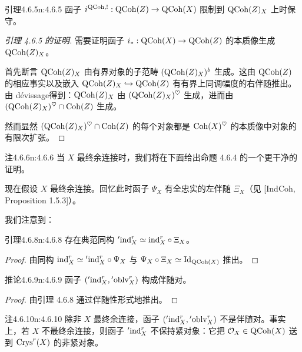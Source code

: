 \begin{othm}{引理}{4.6.5}{n:4.6.5}
函子 $i^{\mathrm{QCoh},!}:\mathrm{QCoh}(Z)\to\mathrm{QCoh}(X)$ 限制到 $\mathrm{QCoh}(Z)_X$ 上时保守。
\end{othm}

\begin{proof}[引理 4.6.5 的证明]
需要证明函子 $i_*:\mathrm{QCoh}(X)\to\mathrm{QCoh}(Z)$ 的本质像生成 $\mathrm{QCoh}(Z)_X$。

首先断言 $\mathrm{QCoh}(Z)_X$ 由有界对象的子范畴 $(\mathrm{QCoh}(Z)_X)^b$ 生成。这由 $\mathrm{QCoh}(Z)$ 的相应事实以及嵌入 $\mathrm{QCoh}(Z)_X\hookrightarrow\mathrm{QCoh}(Z)$ 有有界上同调幅度的右伴随推出。由 dévissage得到：$\mathrm{QCoh}(Z)_X$ 由 $(\mathrm{QCoh}(Z)_X)^{\heartsuit}$ 生成，进而由 $(\mathrm{QCoh}(Z)_X)^{\heartsuit}\cap\mathrm{Coh}(Z)$ 生成。

然而显然 $(\mathrm{QCoh}(Z)_X)^{\heartsuit}\cap\mathrm{Coh}(Z)$ 的每个对象都是 $\mathrm{Coh}(X)^{\heartsuit}$ 的本质像中对象的有限次扩张。
\end{proof}

\begin{othm}{注}{4.6.6}{n:4.6.6}
当 $X$ 最终余连接时，我们将在下面给出命题 4.6.4 的一个更干净的证明。
\end{othm}

现在假设 $X$ 最终余连接。回忆此时函子 $\Psi_X$ 有全忠实的左伴随 $\Xi_X$（见 [IndCoh, Proposition 1.5.3]）。

我们注意到：

\begin{othm}{引理}{4.6.8}{n:4.6.8}
存在典范同构 ${}'\mathrm{ind}^r_X\simeq\mathrm{ind}^r_X\circ\Xi_X$。
\end{othm}

\begin{proof}
由同构 $\mathrm{ind}^r_X\simeq{}'\mathrm{ind}^r_X\circ\Psi_X$ 与 $\Psi_X\circ\Xi_X\simeq\mathrm{Id}_{\mathrm{QCoh}(X)}$ 推出。
\end{proof}

\begin{othm}{推论}{4.6.9}{n:4.6.9}
函子 $({}'\mathrm{ind}^r_X,{}'\mathrm{oblv}^r_X)$ 构成伴随对。
\end{othm}

\begin{proof}
由引理 4.6.8 通过伴随性形式地推出。
\end{proof}

\begin{othm}{注}{4.6.10}{n:4.6.10}
除非 $X$ 最终余连接，函子 $({}'\mathrm{ind}^r_X,{}'\mathrm{oblv}^r_X)$ 不是伴随对。事实上，若 $X$ 不最终余连接，则函子 ${}'\mathrm{ind}^r_X$ 不保持紧对象：它把 $\mathcal{O}_X\in\mathrm{QCoh}(X)$ 送到 $\mathrm{Crys}^r(X)$ 的非紧对象。
\end{othm}

